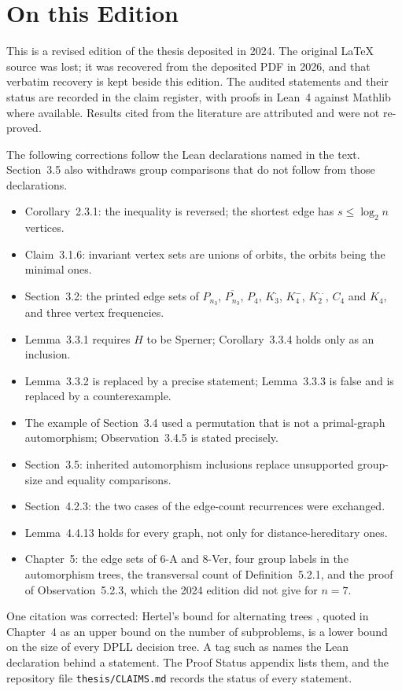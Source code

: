 \documentclass{sfuthesis}
\begin{document}
\chapter*{On this Edition}
This is a revised edition of the thesis deposited in 2024. The original \LaTeX{} source was lost; it was recovered from the deposited PDF in 2026, and that verbatim recovery is kept beside this edition. The audited statements and their status are recorded in the claim register, with proofs in Lean~4 against Mathlib where available. Results cited from the literature are attributed and were not re-proved.

The following corrections follow the Lean declarations named in the text. Section~3.5 also withdraws group comparisons that do not follow from those declarations.
\begin{itemize}
\item Corollary~2.3.1: the inequality is reversed; the shortest edge has $s\le\log_2 n$ vertices.
\item Claim~3.1.6: invariant vertex sets are unions of orbits, the orbits being the minimal ones.
\item Section~3.2: the printed edge sets of $P_{n_3}$, $\overline{P_{n_3}}$, $P_4$, $K_3^{\cdot}$, $K_4^-$, $K_2^{\cdot\cdot}$, $C_4$ and $K_4$, and three vertex frequencies.
\item Lemma~3.3.1 requires $H$ to be Sperner; Corollary~3.3.4 holds only as an inclusion.
\item Lemma~3.3.2 is replaced by a precise statement; Lemma~3.3.3 is false and is replaced by a counterexample.
\item The example of Section~3.4 used a permutation that is not a primal-graph automorphism; Observation~3.4.5 is stated precisely.
\item Section~3.5: inherited automorphism inclusions replace unsupported group-size and equality comparisons.
\item Section~4.2.3: the two cases of the edge-count recurrences were exchanged.
\item Lemma~4.4.13 holds for every graph, not only for distance-hereditary ones.
\item Chapter~5: the edge sets of 6-A and 8-Ver, four group labels in the automorphism trees, the transversal count of Definition~5.2.1, and the proof of Observation~5.2.3, which the 2024 edition did not give for $n=7$.
\end{itemize}
One citation was corrected: Hertel's bound for alternating trees \cite{Her04}, quoted in Chapter~4 as an upper bound on the number of subproblems, is a lower bound on the size of every DPLL decision tree.
A tag such as  names the Lean declaration behind a statement. The Proof Status appendix lists them, and the repository file \texttt{thesis/CLAIMS.md} records the status of every statement.
\clearpage
\end{document}
